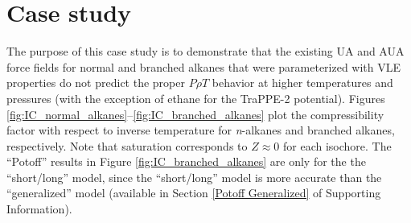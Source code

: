 \documentclass[preprint,letterpaper,floatfix,citeautoscript,aip,jcp]{revtex4-1}
\begin{document}

\section{Case study} \label{Case Study}

The purpose of this case study is to demonstrate that the existing UA and AUA force fields for normal and branched alkanes that were parameterized with VLE properties do not predict the proper $P \rho T$ behavior at higher temperatures and pressures (with the exception of ethane for the TraPPE-2 potential). Figures \ref{fig:IC_normal_alkanes}--\ref{fig:IC_branched_alkanes} plot the compressibility factor with respect to inverse temperature for \textit{n}-alkanes and branched alkanes, respectively. Note that saturation corresponds to $Z \approx 0$ for each isochore. The ``Potoff'' results in Figure \ref{fig:IC_branched_alkanes} are only for the the ``short/long'' model, since the ``short/long'' model is more accurate than the ``generalized'' model (available in Section \ref{Potoff Generalized} of Supporting Information). 
\end{document}
